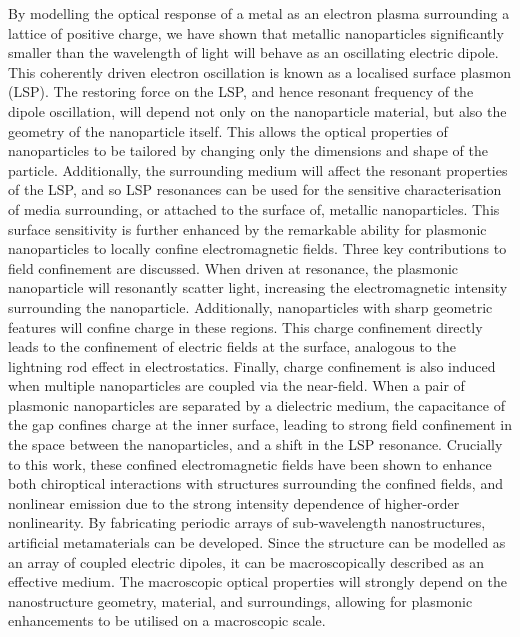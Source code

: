 By modelling the optical response of a metal as an electron plasma surrounding a lattice of positive charge, we have shown that metallic nanoparticles significantly smaller than the wavelength of light will behave as an oscillating electric dipole. This coherently driven electron oscillation is known as a localised surface plasmon (LSP). The restoring force on the LSP, and hence resonant frequency of the dipole oscillation, will depend not only on the nanoparticle material, but also the geometry of the nanoparticle itself. This allows the optical properties of nanoparticles to be tailored by changing only the dimensions and shape of the particle. Additionally, the surrounding medium will affect the resonant properties of the LSP, and so LSP resonances can be used for the sensitive characterisation of media surrounding, or attached to the surface of, metallic nanoparticles.
This surface sensitivity is further enhanced by the remarkable ability for plasmonic nanoparticles to locally confine electromagnetic fields. Three key contributions to field confinement are discussed. When driven at resonance, the plasmonic nanoparticle will resonantly scatter light, increasing the electromagnetic intensity surrounding the nanoparticle. Additionally, nanoparticles with sharp geometric features will confine charge in these regions. This charge confinement directly leads to the confinement of electric fields at the surface, analogous to the lightning rod effect in electrostatics. Finally, charge confinement is also induced when multiple nanoparticles are coupled via the near-field. When a pair of plasmonic nanoparticles are separated by a dielectric medium, the capacitance of the gap confines charge at the inner surface, leading to strong field confinement in the space between the nanoparticles, and a shift in the LSP resonance.
Crucially to this work, these confined electromagnetic fields have been shown to enhance both chiroptical interactions with structures surrounding the confined fields, and nonlinear emission due to the strong intensity dependence of higher-order nonlinearity. 
By fabricating periodic arrays of sub-wavelength nanostructures, artificial metamaterials can be developed. Since the structure can be modelled as an array of coupled electric dipoles, it can be macroscopically described as an effective medium. The macroscopic optical properties will strongly depend on the nanostructure geometry, material, and surroundings, allowing for plasmonic enhancements to be utilised on a macroscopic scale.
